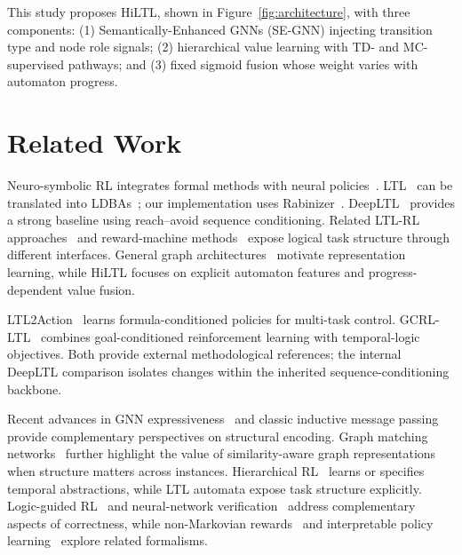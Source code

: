 \documentclass[journal]{IEEEtran}
\begin{document}
This study proposes HiLTL, shown in Figure~\ref{fig:architecture}, with three components: (1) Semantically-Enhanced GNNs (SE-GNN) injecting transition type and node role signals; (2) hierarchical value learning with TD- and MC-supervised pathways; and (3) fixed sigmoid fusion whose weight varies with automaton progress.

\section{Related Work}
\label{sec:related}

Neuro-symbolic RL integrates formal methods with neural policies~\citep{Jothimurugan2021}. LTL~\citep{Pnueli1977,Baier2008} can be translated into LDBAs~\citep{Sickert2016}; our implementation uses Rabinizer~\citep{Rabinizer2018}. DeepLTL~\citep{deepltl} provides a strong baseline using reach--avoid sequence conditioning. Related LTL-RL approaches~\citep{Vaezipoor2021,Hahn2021,bozkurt2020control} and reward-machine methods~\citep{Icarte2022,Toro2020} expose logical task structure through different interfaces. General graph architectures~\citep{Kipf2017,Gilmer2017} motivate representation learning, while HiLTL focuses on explicit automaton features and progress-dependent value fusion.

LTL2Action~\citep{Vaezipoor2021} learns formula-conditioned policies for multi-task control. GCRL-LTL~\citep{Qiu2023} combines goal-conditioned reinforcement learning with temporal-logic objectives. Both provide external methodological references; the internal DeepLTL comparison isolates changes within the inherited sequence-conditioning backbone.

Recent advances in GNN expressiveness~\citep{Dwivedi2023,sato2020survey,ying2021transformers,morris2019weisfeiler} and classic inductive message passing~\citep{Hamilton2017} provide complementary perspectives on structural encoding. Graph matching networks~\citep{li2019graph} further highlight the value of similarity-aware graph representations when structure matters across instances. Hierarchical RL~\citep{Sutton2018,Bacon2017,Nachum2018,Vezhnevets2017} learns or specifies temporal abstractions, while LTL automata expose task structure explicitly. Logic-guided RL~\citep{HasanbeigCertified2021} and neural-network verification~\citep{katz2017reluplex} address complementary aspects of correctness, while non-Markovian rewards~\citep{Gaon2020} and interpretable policy learning~\citep{glanois2024survey} explore related formalisms.
\end{document}
